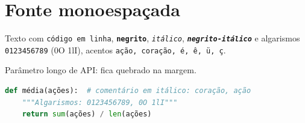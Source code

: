 \documentclass{abntex2-ufv}
\begin{document}
\textual
\chapter{Fonte monoespaçada}
Texto com \texttt{código em linha}, \texttt{\textbf{negrito}}, \texttt{\textit{itálico}},
\texttt{\textbf{\textit{negrito-itálico}}} e algarismos \texttt{0123456789} (0O 1lI), acentos
\texttt{ação, coração, é, ê, ü, ç}.

Parâmetro longo de API: \texttt{}
fica quebrado na margem.

\begin{codigo}[htbp]
\begin{ilustracao}[\linewidth]{\caption{Listagem com acentos, negrito, itálico e algarismos}\label{cod:fonte}}{\elaboracaopropria}
\begin{lstlisting}[language=Python]
def média(ações):  # comentário em itálico: coração, ação
    """Algarismos: 0123456789, 0O 1lI"""
    return sum(ações) / len(ações)
\end{lstlisting}
\end{ilustracao}
\end{codigo}
\end{document}
